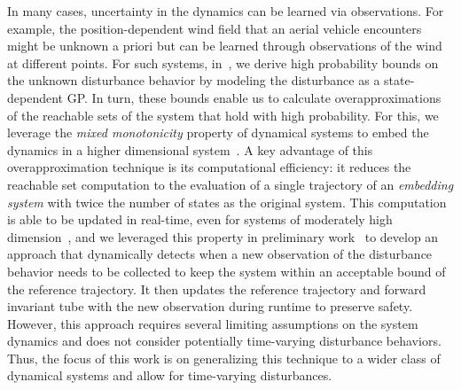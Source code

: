 \documentclass{IEEEojcsys}
\begin{document}
In many cases, uncertainty in the dynamics can be learned via observations. For example, the position-dependent wind field that an aerial vehicle encounters might be unknown a priori but can be learned through observations of the wind at different points. 
For such systems, in~\cite{caoMMGPs, caoMMGPOJCSYS}, we derive high probability bounds on the unknown disturbance behavior by modeling the disturbance as a state-dependent \ac{GP}. In turn, these bounds enable us to calculate overapproximations of the reachable sets of the system that hold with high probability. For this, we leverage the \emph{mixed monotonicity} property of dynamical systems to embed the dynamics in a higher dimensional system~\cite{cooganMixMono, ENCISO2006205}. A key advantage of this overapproximation technique is its computational efficiency: it reduces the reachable set computation to the evaluation of a single trajectory of an \emph{embedding system} with twice the number of states as the original system. This computation is able to be updated in real-time, even for systems of moderately high dimension~\cite{abate2021hscc}, and we leveraged this property in preliminary work~\cite{caoICRARTA}
to develop an approach that dynamically detects when a new observation of the disturbance behavior needs to be collected to keep the system within an acceptable bound of the reference trajectory. It then updates the reference trajectory and forward invariant tube with the new observation during runtime to preserve safety. However, this approach requires several limiting assumptions on the system dynamics and does not consider potentially time-varying disturbance behaviors. Thus, the focus of this work is on generalizing this technique to a wider class of dynamical systems and allow for time-varying disturbances.
\end{document}
